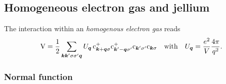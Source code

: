 \subsection{Homogeneous electron gas and jellium}

The interaction within an \emph{homogenous electron gas} reads
%
\begin{align*}
    \mathrm V = \frac 1 2 \sum_{\boldsymbol k \boldsymbol k' \sigma \sigma' \boldsymbol q} U_{\boldsymbol q} \,
    \mathrm c_{\boldsymbol k + \boldsymbol q \sigma}^+
    \mathrm c_{\boldsymbol k' - \boldsymbol q \sigma'}^+
    \mathrm c_{\boldsymbol k' \sigma'}
    \mathrm c_{\boldsymbol k \sigma}
    \quad \text{with} \quad
    U_{\boldsymbol q} = \frac{e^2}{V} \frac{4 \pi}{q^2}.
\end{align*}

\subsubsection{Normal  function}

